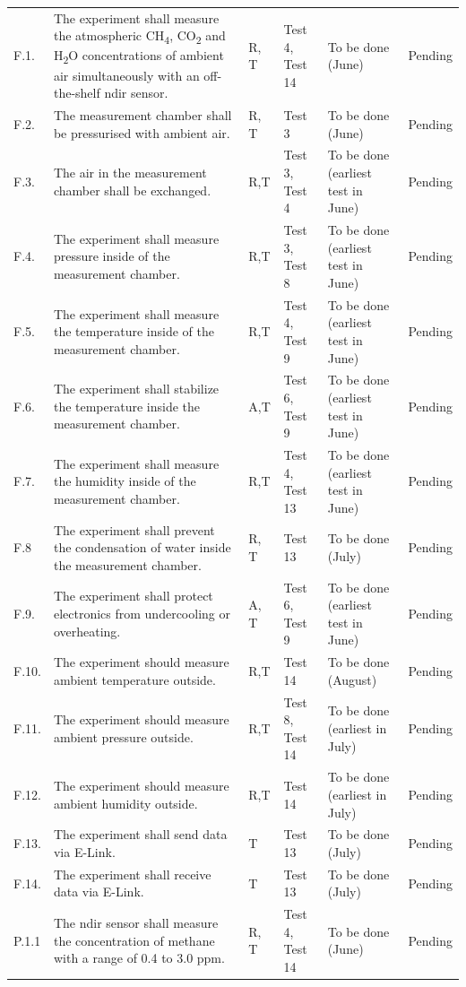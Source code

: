 \begin{longtable}{L{0.7cm}L{5cm}L{1.5cm}L{2cm}L{2.5cm}L{2cm}}
F.1. & The experiment shall measure the atmospheric CH\textsubscript{4}, CO\textsubscript{2} and H\textsubscript{2}O concentrations of ambient air simultaneously with an off-the-shelf \gls{ndir} sensor. & R, T & Test 4, Test 14 & To be done (June) & Pending \\
F.2. & The measurement chamber shall be pressurised with ambient air. & R, T & Test 3 & To be done (June) & Pending \\
F.3. & The air in the measurement chamber shall be exchanged. & R,T & Test 3, Test 4 & To be done (earliest test in June) & Pending \\
F.4. & The experiment shall measure pressure inside of the measurement chamber. & R,T & Test 3, Test 8 & To be done (earliest test in June) & Pending \\
F.5. & The experiment shall measure the temperature inside of the measurement chamber. & R,T & Test 4, Test 9  & To be done (earliest test in June) & Pending \\
F.6. & The experiment shall stabilize the temperature inside the measurement chamber. & A,T & Test 6, Test 9 & To be done (earliest test in June) & Pending \\
F.7. & The experiment shall measure the humidity inside of the measurement chamber. & R,T & Test 4, Test 13 & To be done (earliest test in June) & Pending \\
F.8 & The experiment shall prevent the condensation of water inside the measurement chamber. & R, T & Test 13 & To be done (July) & Pending \\
F.9. & The experiment shall protect electronics from undercooling or overheating. & A, T & Test 6, Test 9 & To be done (earliest test in June) & Pending\\
F.10. & The experiment should measure ambient temperature outside. & R,T & Test 14 & To be done (August) & Pending \\
F.11. & The experiment should measure ambient pressure outside. & R,T &  Test 8, Test 14 & To be done (earliest in July) & Pending \\
F.12. & The experiment should measure ambient humidity outside. & R,T & Test 14 & To be done (earliest in July) & Pending \\
F.13. & The experiment shall send data via E-Link. & T & Test 13 & To be done (July) & Pending \\
F.14. & The experiment shall receive data via E-Link. & T & Test 13 & To be done (July) & Pending \\
P.1.1 & The \gls{ndir} sensor shall measure the concentration of methane with a range of 0.4 to 3.0 ppm. & R, T & Test 4, Test 14 & To be done (June) & Pending \\

\end{longtable}
